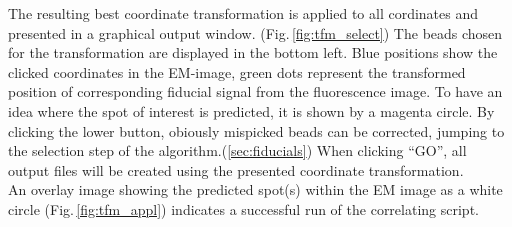 \documentclass[10pt,a4paper,onepage,DIV12]{scrartcl}
\begin{document}
The resulting best coordinate transformation is applied to all cordinates and presented in a graphical output window. (Fig.\,\ref{fig:tfm_select}) The beads chosen for the transformation are displayed in the bottom left. Blue positions show the clicked coordinates in the EM-image, green dots represent the transformed position of corresponding fiducial signal from the fluorescence image. To have an idea where the spot of interest is predicted, it is shown by a magenta circle. By clicking the lower button, obiously mispicked beads can be corrected, jumping to the selection step of the algorithm.(\ref{sec:fiducials}) When clicking ``GO'', all output files will be created using the presented coordinate transformation.\\
An overlay image showing the predicted spot(s) within the EM image as a white circle (Fig.\,\ref{fig:tfm_appl}) indicates a successful run of the correlating script.
\end{document}
